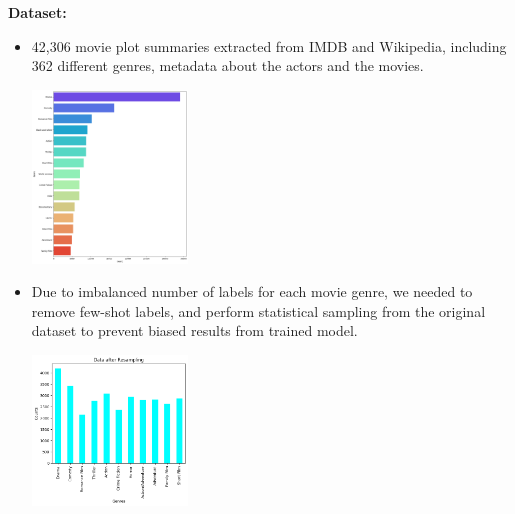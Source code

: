 \documentclass[hbrs-poster.tex]{subfiles}
\begin{document}
{        
        \textbf{Dataset:}
        \begin{itemize}
            \item 42,306 movie plot summaries extracted from IMDB and Wikipedia,
            including 362 different genres, metadata about the actors and the movies. 
            \begin{tikzfigure}
                \includegraphics[width=0.325\textwidth, height=0.255\textheight]{figures/output.png}
            \end{tikzfigure}
            \item Due to imbalanced number of labels for each movie genre, we needed to remove few-shot labels, and perform statistical sampling from the original dataset to prevent biased results from trained model.
            \begin{tikzfigure}
                \includegraphics[width=0.325\textwidth, height=0.155\textheight]{figures/output2.png}
            \end{tikzfigure}
        \end{itemize} 
    


    
    }
\end{document}
